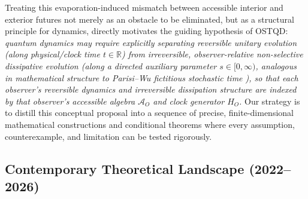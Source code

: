 \documentclass[11pt,a4paper]{article}
\theoremstyle{definition}
\theoremstyle{remark}
\newcommand{\cA}{\mathcal{A}}
\newcommand{\bbR}{\mathbb{R}}
\newcommand{\1}{\mathbf{1}}
\begin{document}
Treating this evaporation-induced mismatch between accessible interior and exterior futures not merely as an obstacle to be eliminated, but as a structural principle for dynamics, directly motivates the guiding hypothesis of OSTQD: \emph{quantum dynamics may require explicitly separating reversible unitary evolution (along physical/clock time $t \in \bbR$) from irreversible, observer-relative non-selective dissipative evolution (along a directed auxiliary parameter $s \in [0,\infty)$, analogous in mathematical structure to Parisi--Wu fictitious stochastic time \cite{ParisiWu1981}), so that each observer's reversible dynamics and irreversible dissipation structure are indexed by that observer's accessible algebra $\cA_O$ and clock generator $H_O$.} Our strategy is to distill this conceptual proposal into a sequence of precise, finite-dimensional mathematical constructions and conditional theorems where every assumption, counterexample, and limitation can be tested rigorously.

\subsection{Contemporary Theoretical Landscape (2022--2026)}\label{sec:landscape}
\end{document}
